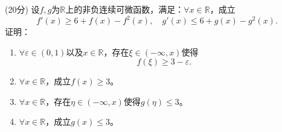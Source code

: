 \documentclass[loose]{ExBook}
\begin{document}
\begin{qitems}
    \begin{bbox}
        \qitem (20分) 设$f,g$为$\mathbb{R}$上的非负连续可微函数，满足：$\forall x \in \mathbb{R}$，成立
        \[
        f'(x) \geq 6 + f(x) - f^2(x), \quad g'(x) \leq 6 + g(x) - g^2(x).
        \]
        证明：
        \begin{enumerate}[label=(\arabic*)]
            \item $\forall \varepsilon \in (0,1)$以及$x \in \mathbb{R}$，存在$\xi \in (-\infty,x)$使得
            \[
            f(\xi) \geq 3 - \varepsilon.
            \]
            \item $\forall x \in \mathbb{R}$，成立$f(x) \geq 3$。
            \item $\forall x \in \mathbb{R}$，存在$\eta \in (-\infty,x)$使得$g(\eta) \leq 3$。
            \item $\forall x \in \mathbb{R}$，成立$g(x) \leq 3$。
        \end{enumerate}
    \end{bbox}
\end{qitems}
\end{document}

